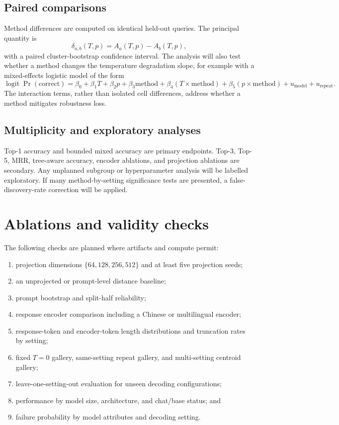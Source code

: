 \documentclass[11pt,a4paper]{article}
\begin{document}
\subsection{Paired comparisons}

Method differences are computed on identical held-out queries. The principal
quantity is
\[
  \delta_{a,b}(T,p)=A_a(T,p)-A_b(T,p),
\]
with a paired cluster-bootstrap confidence interval. The analysis will also
test whether a method changes the temperature degradation slope, for example
with a mixed-effects logistic model of the form
\[
  \operatorname{logit}\Pr(\mathrm{correct})
  =\beta_0+\beta_1 T+\beta_2 p+\beta_3\mathrm{method}
   +\beta_4(T\times\mathrm{method})
   +\beta_5(p\times\mathrm{method})+u_{\mathrm{model}}+u_{\mathrm{repeat}}.
\]
The interaction terms, rather than isolated cell differences, address whether
a method mitigates robustness loss.

\subsection{Multiplicity and exploratory analyses}

Top-1 accuracy and bounded mixed accuracy are primary endpoints. Top-3, Top-5,
MRR, tree-aware accuracy, encoder ablations, and projection ablations are
secondary. Any unplanned subgroup or hyperparameter analysis will be labelled
exploratory. If many method-by-setting significance tests are presented, a
false-discovery-rate correction will be applied.

\section{Ablations and validity checks}

The following checks are planned where artifacts and compute permit:

\begin{enumerate}
  \item projection dimensions $\{64,128,256,512\}$ and at least five projection
        seeds;
  \item an unprojected or prompt-level distance baseline;
  \item prompt bootstrap and split-half reliability;
  \item response encoder comparison including a Chinese or multilingual
        encoder;
  \item response-token and encoder-token length distributions and truncation
        rates by setting;
  \item fixed $T=0$ gallery, same-setting repeat gallery, and multi-setting
        centroid gallery;
  \item leave-one-setting-out evaluation for unseen decoding configurations;
  \item performance by model size, architecture, and chat/base status; and
  \item failure probability by model attributes and decoding setting.
\end{enumerate}
\end{document}

